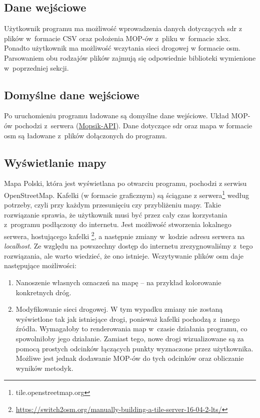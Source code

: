 \subsection{Dane wejściowe}
Użytkownik programu ma możliwość wprowadzenia danych dotyczących \acrshort{sdr}
z plików w~formacie CSV oraz położenia MOP-ów z~pliku w~formacie xlsx. 
Ponadto użytkownik ma możliwość wczytania sieci drogowej w
formacie \acrshort{osm}. Parsowaniem obu rodzajów plików zajmują się odpowiednie
biblioteki wymienione w~poprzedniej sekcji.
\subsection{Domyślne dane wejściowe}
Po uruchomieniu programu ładowane są domyślne dane wejściowe. Układ MOP-ów
pochodzi z~serwera (\hyperref[mopsik_api]{Mopsik-API}). Dane dotyczące \acrshort{sdr} oraz mapa w
formacie \acrshort{osm} są
ładowane z~plików dołączonych do programu. 
\subsection{Wyświetlanie mapy}
Mapa Polski, która jest wyświetlana po otwarciu programu, pochodzi z
serwisu \mbox{OpenStreetMap}\cite{osm}. Kafelki (w formacie graficznym) są ściągane z
serwera\footnote{tile.openstreetmap.org} według potrzeby, czyli
przy każdym przesunięciu czy przybliżeniu mapy. Takie rozwiązanie sprawia, że
użytkownik musi być przez cały czas korzystania z~programu podłączony
do internetu. Jest możliwość stworzenia lokalnego serwera, hostującego
kafelki
\footnote{\url{https://switch2osm.org/manually-building-a-tile-server-16-04-2-lts/}}, a
następnie zmiany w~kodzie adresu serwera na \textit{localhost}. Ze względu na
powszechny dostęp do internetu zrezygnowaliśmy z~tego rozwiązania, ale warto
wiedzieć, że ono istnieje. 
Wczytywanie plików \acrshort{osm} daje następujące możliwości:
\begin{enumerate}
  \item Nanoszenie własnych oznaczeń na mapę -- na przykład kolorowanie
    konkretnych dróg.
  \item Modyfikowanie sieci drogowej. W tym wypadku zmiany nie zostaną
    wyświetlone tak jak istniejące drogi, ponieważ kafelki pochodzą z~innego
    źródła. Wymagałoby to renderowania map w~czasie działania programu, co
    spowolniłoby jego działanie. Zamiast tego, nowe drogi wizualizowane są
    za pomocą prostych odcinków łączących punkty wyznaczone przez użytkownika. 
    Możliwe jest jednak dodawanie MOP-ów do tych odcinków oraz obliczanie
    wyników metodyk.
\end{enumerate}
